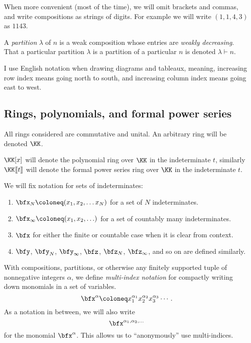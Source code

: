 \documentclass{article}
\newcommand{\fps}[2]{#1 [\kern-1.2pt[ {#2} ]\kern-1.2pt]}
\newcommand{\pring}[2]{#1 [ {#2} ]}
\begin{document}
When more convenient (most of the time), we will omit brackets and commas, and write compositions as strings of digits. For example we will write $(1,1,4,3)$ as $1143$.

A \textit{partition} $\lambda$ of $n$ is a weak composition whose entries are \textit{weakly decreasing}. 
That a particular partition $\lambda$ is a partition of a particular $n$ is denoted $\lambda \vdash n$. 

I use English notation when drawing diagrams and tableaux, meaning, increasing row index means going north to south, and increasing column index means going east to west.

\subsection*{Rings, polynomials, and formal power series}

All rings considered are commutative and unital. An arbitrary ring will be denoted $\KK$. 

$\pring{\KK}{x}$ will denote the polynomial ring over $\KK$ in the indeterminate $t$, similarly $\fps{\KK}{t}$ will denote the formal power series ring over $\KK$ in the indeterminate $t$.

We will fix notation for sets of indeterminates:

\begin{enumerate}[label=(\alph*)]
    \item $\bfx_N \coloneq (x_1, x_2, \ldots x_N)$ for a set of $N$ indeterminates.
    \item $\bfx_\infty \coloneq (x_1, x_2, \ldots)$ for a set of countably many indeterminates.
    \item $\bfx$ for either the finite or countable case when it is clear from context.
    \item $\bfy$, $\bfy_N$, $\bfy_\infty$, $\bfz$, $\bfz_N$, $\bfz_\infty$, and so on are defined similarly.
\end{enumerate}

With compositions, partitions, or otherwise any finitely supported tuple of nonnegative integers $\alpha$, we define \textit{multi-index notation} for compactly writing down monomials in a set of variables.
\[
    \bfx^\alpha
    \coloneq
    x_1^{\alpha_1}x_2^{\alpha_2}x_3^{\alpha_3}\cdots.
\]
As a notation in between, we will also write
\[
    \bfx^{\alpha_1,\alpha_2,\ldots}
\]
for the monomial $\bfx^\alpha$.
This allows us to ``anonymously'' use multi-indices.
\end{document}
